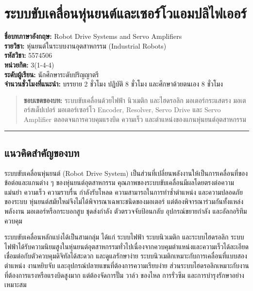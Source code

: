 \section{ระบบขับเคลื่อนหุ่นยนต์และเซอร์โวแอมปลิไฟเออร์}

\textbf{ชื่อบทภาษาอังกฤษ:} Robot Drive Systems and Servo Amplifiers \\
\textbf{รายวิชา:} หุ่นยนต์ในระบบงานอุตสาหกรรม (Industrial Robots) \\
\textbf{รหัสวิชา:} 5574506 \\
\textbf{หน่วยกิต:} 3(1-4-4) \\
\textbf{ระดับผู้เรียน:} นักศึกษาระดับปริญญาตรี \\
\textbf{จำนวนชั่วโมงที่แนะนำ:} บรรยาย 2 ชั่วโมง ปฏิบัติ 8 ชั่วโมง และศึกษาด้วยตนเอง 8 ชั่วโมง \\

\begin{quote}
    \textbf{ขอบเขตของบท:} ระบบขับเคลื่อนด้วยไฟฟ้า นิวเมติก และไฮดรอลิก มอเตอร์กระแสตรง มอเตอร์สเต็ปเปอร์ มอเตอร์เซอร์โว Encoder, Resolver, Servo Drive และ Servo Amplifier ตลอดจนการควบคุมแรงบิด ความเร็ว และตำแหน่งของแกนหุ่นยนต์อุตสาหกรรม
\end{quote}

\par\noindent\rule{\textwidth}{0.4pt}\par

\subsection{แนวคิดสำคัญของบท}

\indent ระบบขับเคลื่อนหุ่นยนต์ (Robot Drive System) เป็นส่วนที่เปลี่ยนพลังงานให้เป็นการเคลื่อนที่ของข้อต่อและแกนต่าง ๆ ของหุ่นยนต์อุตสาหกรรม คุณภาพของระบบขับเคลื่อนมีผลโดยตรงต่อความแม่นยำ ความเร็ว ความราบรื่น กำลังรับโหลด ความสามารถในการทำซ้ำตำแหน่ง และความปลอดภัยของระบบ หุ่นยนต์สมัยใหม่จึงไม่ได้พิจารณาเฉพาะชนิดของมอเตอร์ แต่ต้องพิจารณาร่วมกันทั้งแหล่งพลังงาน มอเตอร์หรือกระบอกสูบ ชุดส่งกำลัง ตัวตรวจจับป้อนกลับ อุปกรณ์ขยายกำลัง และอัลกอริทึมควบคุม

ระบบขับเคลื่อนหลักแบ่งได้เป็นสามกลุ่ม ได้แก่ ระบบไฟฟ้า ระบบนิวเมติก และระบบไฮดรอลิก ระบบไฟฟ้าได้รับความนิยมสูงในหุ่นยนต์อุตสาหกรรมทั่วไปเนื่องจากควบคุมตำแหน่งและความเร็วได้ละเอียด เชื่อมต่อกับตัวควบคุมดิจิทัลได้สะดวก และดูแลรักษาง่าย ระบบนิวเมติกเหมาะกับการเคลื่อนที่แบบสองตำแหน่ง งานหยิบจับ และอุปกรณ์ปลายแขนที่ต้องการความเรียบง่าย ส่วนระบบไฮดรอลิกเหมาะกับงานที่ต้องการแรงหรือแรงบิดสูงมาก แต่ต้องจัดการปั๊ม วาล์ว ของไหล การรั่วซึม และการบำรุงรักษาอย่างเหมาะสม

